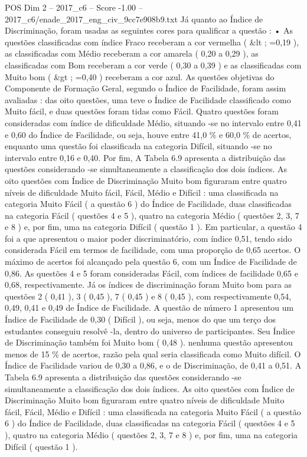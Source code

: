 \begin{textsample}{POS Dim 2 – 2017\_c6 – Score -1.00 – 2017\_c6/enade\_2017\_eng\_civ\_9cc7e908b9.txt}
Já quanto ao Índice de Discriminação, foram usadas as seguintes cores para qualificar a questão : • As questões classificadas com índice Fraco receberam a cor vermelha ( \&lt ; =0,19 ), as classificadas com Médio receberam a cor amarela ( 0,20 a 0,29 ), as classificadas com Bom receberam a cor verde ( 0,30 a 0,39 ) e as classificadas com Muito bom ( \&gt ; =0,40 ) receberam a cor azul.
As questões objetivas do Componente de Formação Geral, segundo o Índice de Facilidade, foram assim avaliadas : das oito questões, uma teve o Índice de Facilidade classificado como Muito fácil, e duas questões foram tidas como Fácil.
Quatro questões foram consideradas com índice de dificuldade Médio, situando -se no intervalo entre 0,41 e 0,60 do Índice de Facilidade, ou seja, houve entre 41,0 \% e 60,0 \% de acertos, enquanto uma questão foi classificada na categoria Difícil, situando -se no intervalo entre 0,16 e 0,40.
Por fim, A Tabela 6.9 apresenta a distribuição das questões considerando -se simultaneamente a classificação dos dois índices.
As oito questões com Índice de Discriminação Muito bom figuraram entre quatro níveis de dificuldade Muito fácil, Fácil, Médio e Difícil : uma classificada na categoria Muito Fácil ( a questão 6 ) do Índice de Facilidade, duas classificadas na categoria Fácil ( questões 4 e 5 ), quatro na categoria Médio ( questões 2, 3, 7 e 8 ) e, por fim, uma na categoria Difícil ( questão 1 ).
Em particular, a questão 4 foi a que apresentou o maior poder discriminatório, com índice 0,51, tendo sido considerada Fácil em termos de facilidade, com uma proporção de 0,65 acertos.
O máximo de acertos foi alcançado pela questão 6, com um Índice de Facilidade de 0,86.
As questões 4 e 5 foram consideradas Fácil, com índices de facilidade 0,65 e 0,68, respectivamente.
Já os índices de discriminação foram Muito bom para as questões 2 ( 0,41 ), 3 ( 0,45 ), 7 ( 0,45 ) e 8 ( 0,45 ), com respectivamente 0,54, 0,49, 0,41 e 0,49 de Índice de Facilidade.
A questão de número 1 apresentou um Índice de Facilidade de 0,30 ( Difícil ), ou seja, menos do que um terço dos estudantes conseguiu resolvê -la, dentro do universo de participantes.
Seu Índice de Discriminação também foi Muito bom ( 0,48 ). nenhuma questão apresentou menos de 15 \% de acertos, razão pela qual seria classificada como Muito difícil.
O Índice de Facilidade variou de 0,30 a 0,86, e o de Discriminação, de 0,41 a 0,51.
A Tabela 6.9 apresenta a distribuição das questões considerando -se simultaneamente a classificação dos dois índices.
As oito questões com Índice de Discriminação Muito bom figuraram entre quatro níveis de dificuldade Muito fácil, Fácil, Médio e Difícil : uma classificada na categoria Muito Fácil ( a questão 6 ) do Índice de Facilidade, duas classificadas na categoria Fácil ( questões 4 e 5 ), quatro na categoria Médio ( questões 2, 3, 7 e 8 ) e, por fim, uma na categoria Difícil ( questão 1 ).

\end{textsample}
